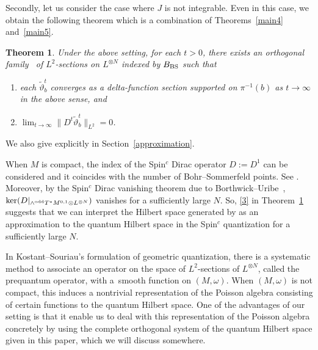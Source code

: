 \documentclass[10pt,a4paper]{amsart}
\numberwithin{equation}{section}
\newtheorem{Theorem}{Theorem}[section]
\renewcommand{\tilde}{\widetilde}
\begin{document}
Secondly, let us consider the case where $J$ is not integrable. Even in this case, we obtain the following theorem which is a combination of Theorems~\ref{main4} and~\ref{main5}.
\begin{Theorem}\label{main non-integrable case}
Under the above setting, for each $t>0$, there exists an orthogonal family~\smash{$\big\{{\tilde \vartheta}^t_b\big\}_{b\in B_{\rm BS}}$} of $L^2$-sections on $L^{\otimes N}$ indexed by $B_{\rm BS}$ such that
\begin{enumerate}\itemsep=0pt
\item[$(1)$] each ${\tilde \vartheta}^t_b$ converges as a delta-function section supported on $\pi^{-1}(b)$ as $t\to \infty$ in the above sense, and
\item[$(2)$] $\displaystyle \lim_{t\to \infty}\big\|D^t {\tilde \vartheta}^t_b\big\|_{L^2}=0$.\label{3}
\end{enumerate}
\end{Theorem}
We also give \smash{$\big\{\tilde \vartheta^t_b\big\}_{b\in B_{\rm BS}}$} explicitly in Section~\ref{approximation}.

When $M$ is compact, the index of the Spin${}^c$ Dirac operator $D:=D^1$ can be considered and it coincides with the number of Bohr--Sommerfeld points. See \cite{FFY1}. Moreover, by the Spin${}^c$ Dirac vanishing theorem due to Borthwick--Uribe~\cite{BU}, $\ker ( D|_{\wedge^{\rm odd}T^*M^{0,1}\otimes L^{\otimes N}})$ vanishes for a sufficiently large $N$. So, \eqref{3} in Theorem~\ref{main non-integrable case} suggests that we can interpret the Hilbert space generated by \smash{$\big\{{\tilde \vartheta}^t_b\big\}_{b\in B_{\rm BS}}$} as an approximation to the quantum Hilbert space in the Spin${}^c$ quantization for a sufficiently large $N$.

In Kostant--Souriau's formulation of geometric quantization, there is a systematic method to associate an operator on the space of $L^2$-sections of $L^{\otimes N}$, called the prequantum operator, with a~smooth function on $(M,\omega)$. When $(M,\omega)$ is not compact, this induces a nontrivial representation of the Poisson algebra consisting of certain functions to the quantum Hilbert space.
One of the advantages of our setting is that it enable us to deal with this representation of the Poisson algebra concretely by using the complete orthogonal system of the quantum Hilbert space given in this paper, which we will discuss somewhere.
\end{document}
